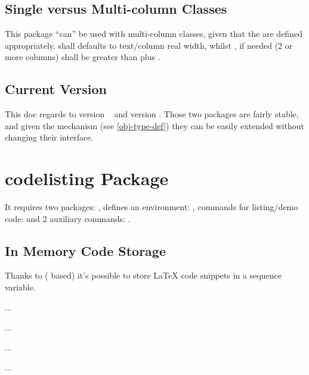 \documentclass{article}
\begin{document}
\subsection{Single versus Multi-column Classes}
This package ``can'' be used with multi-column classes, given that the \tsobj[code]{\linewidth,\columnsep} are defined appropriately. \tsobj{\linewidth} shall defaults to text/column real width, whilst \tsobj{\columnsep}, if needed (2 or more columns) shall be greater than \tsobj{\marginparwidth} plus \tsobj{\marginparsep}.

\subsection{Current Version}
This doc regards to  version ~ and  version . Those two packages are fairly stable, and given the  mechanism (see \ref{obj-type-def}) they can be easily extended without changing their interface.

\section{codelisting Package}

It requires two packages: ,  defines an environment: , commands for listing/demo code: \tsobj[code]{\tscode,\tsmergedcode,\tsdemo,\tsresult,\tsexec} and 2 auxiliary commands: \tsobj{\setcodekeys,\setnewcodekey}.

\subsection{In Memory Code Storage}
Thanks to  ( based) it's possible to store \LaTeX{} code snippets in a  sequence variable.


\begin{codestore}
  \begin{codestore}[store-env = store:A]
  ...
  \end{codestore}
  
  \begin{codestore}[st = store:A]
  ...
  \end{codestore}

  \begin{codestore}[storeA]
  ...
  \end{codestore}
  
  \begin{codestore}[store:A]
  ...  
  \end{codestore}
\end{codestore}
\end{document}
